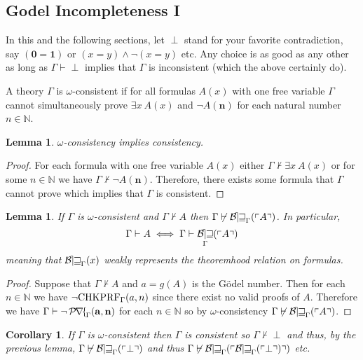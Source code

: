 \documentclass[12pt, leqno]{article}
\newcommand{\N}{\mathbb{N}}
\renewcommand{\bf}[1]{\mathbf{#1}}
\newcommand{\proves}{\vdash}
\newcommand{\eq}[1]{\exists{#1} \:}
\newenvironment{definition}[1][Definition:]{\begin{trivlist}
\item[\hskip \labelsep {\bfseries #1}]}{\end{trivlist}}
\theoremstyle{theorem}
\newtheorem{lemma}[theorem]{Lemma}
\newtheorem{corollary}[theorem]{Corollary}
\theoremstyle{definition}
\theoremstyle{definition}
\theoremstyle{remark}
\theoremstyle{definition}
\theoremstyle{remark}
\DeclareMathOperator{\Prf}{\mathcal{P\mkern-2mu r\mkern-2.5mu f\mkern-2mu}}
\DeclareMathOperator{\Bew}{\mathcal{B\mkern-2.0mu e\mkern-2.0mu w\mkern-1mu}}
\newcommand{\Gterm}[1]{\left\ulcorner #1 \right\urcorner}
\newcommand{\Thm}[1]{\Bew_{\Gamma}(\Gterm{#1})}
\begin{document}
\subsection{Godel Incompleteness I}

In this and the following sections, let $\perp$ stand for your favorite contradiction, say $(\bf{0} = \bf{1})$ or $(x = y) \wedge \neg (x = y)$ etc. Any choice is as good as any other as long as $\Gamma \proves \perp$ implies that $\Gamma$ is inconsistent (which the above certainly do). 

\begin{definition} 
A theory $\Gamma$ is $\omega$-consistent if for all formulas $A(x)$ with one free variable $\Gamma$ cannot simultaneously prove $\eq{x} A(x)$ and $\neg A(\bf{n})$ for each natural number $n \in \N$.
\end{definition}

\begin{lemma}
$\omega$-consistency implies consistency.
\end{lemma}

\begin{proof}
For each formula with one free variable $A(x)$ either $\Gamma \not\proves \eq{x} A(x)$ or for some $n \in \N$ we have $\Gamma \not\proves \neg A(\bf{n})$. Therefore, there exists some formula that $\Gamma$ cannot prove which implies that $\Gamma$ is consistent. 
\end{proof}

\begin{lemma}
If $\Gamma$ is $\omega$-consistent and $\Gamma \not\proves A$ then $\Gamma \not\proves \Thm{A}$. In particular,
\[ \Gamma \proves A \iff \Gamma \proves \Thm{A} \] 
meaning that $\Bew_{\Gamma}(x)$ weakly represents the theoremhood relation on formulas.
\end{lemma}

\begin{proof}
Suppose that $\Gamma \not\proves A$ and $a = g(A)$ is the G\"{o}del number. Then for each $n \in \N$ we have $\neg \mathrm{CHKPRF}_{\Gamma}(a, n)$ since there exist no valid proofs of $A$. Therefore we have $\Gamma \proves \neg \Prf_{\Gamma}(\bf{a}, \bf{n})$ for each $n \in \N$ so by $\omega$-consistency $\Gamma \not\proves \Thm{A}$. 
\end{proof}

\begin{corollary}
If $\Gamma$ is $\omega$-consistent then $\Gamma$ is consistent so $\Gamma \not\proves \perp$ and thus, by the previous lemma, $\Gamma \not\proves \Thm{\perp}$ and thus $\Gamma \not\proves \Thm{\Thm{\perp}}$ etc. 
\end{corollary}
\end{document}
